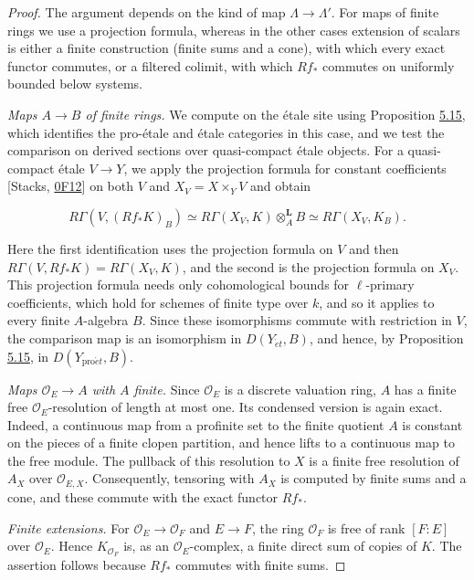 \documentclass[11pt]{article}
\begin{document}
\begin{proof}[{Proof}]\label{bp617}%
The argument depends on the kind of map \(\Lambda\to\Lambda'\). For maps of finite rings we use a projection formula, whereas in the other cases extension of scalars is either a finite construction (finite sums and a cone), with which every exact functor commutes, or a filtered colimit, with which \(Rf_*\) commutes on uniformly bounded below systems.

\emph{Maps \(A\to B\) of finite rings.} We compute on the étale site using Proposition \hyperref[bp454]{5.15}, which identifies the pro-étale and étale categories in this case, and we test the comparison on derived sections over quasi-compact étale objects. For a quasi-compact étale \(V\to Y\), we apply the projection formula for constant coefficients [Stacks, \href{https://stacks.math.columbia.edu/tag/0F12}{0F12}] on both \(V\) and \(X_V=X\times_YV\) and obtain

\[
R\Gamma(V,(Rf_*K)_B)
\simeq R\Gamma(X_V,K)\otimes_A^{\mathbf L}B
\simeq R\Gamma(X_V,K_B).
\]

Here the first identification uses the projection formula on \(V\) and then \(R\Gamma(V,Rf_*K)=R\Gamma(X_V,K)\), and the second is the projection formula on \(X_V\). This projection formula needs only cohomological bounds for \(\ell\)-primary coefficients, which hold for schemes of finite type over \(k\), and so it applies to every finite \(A\)-algebra \(B\). Since these isomorphisms commute with restriction in \(V\), the comparison map is an isomorphism in \(D(Y_{\acute{e}t},B)\), and hence, by Proposition \hyperref[bp454]{5.15}, in \(D(Y_{\mathrm{pro}\acute{e}t},B)\).

\emph{Maps \(\mathcal O_E\to A\) with \(A\) finite.} Since \(\mathcal O_E\) is a discrete valuation ring, \(A\) has a finite free \(\mathcal O_E\)-resolution of length at most one. Its condensed version is again exact. Indeed, a continuous map from a profinite set to the finite quotient \(A\) is constant on the pieces of a finite clopen partition, and hence lifts to a continuous map to the free module. The pullback of this resolution to \(X\) is a finite free resolution of \(A_X\) over \(\mathcal O_{E,X}\). Consequently, tensoring with \(A_X\) is computed by finite sums and a cone, and these commute with the exact functor \(Rf_*\).

\emph{Finite extensions.} For \(\mathcal O_E\to\mathcal O_F\) and \(E\to F\), the ring \(\mathcal O_F\) is free of rank \([F:E]\) over \(\mathcal O_E\). Hence \(K_{\mathcal O_F}\) is, as an \(\mathcal O_E\)-complex, a finite direct sum of copies of \(K\). The assertion follows because \(Rf_*\) commutes with finite sums.


\end{proof}
\end{document}
